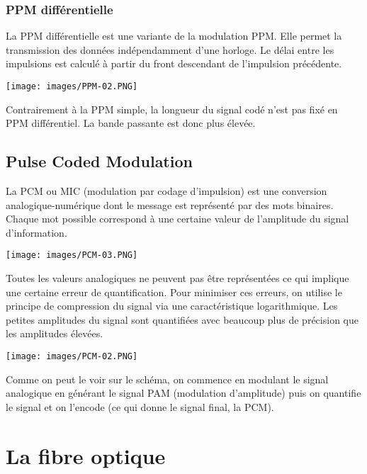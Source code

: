 \documentclass[a4paper]{article}
\begin{document}
\subsubsection{PPM différentielle}

La PPM différentielle est une variante de la modulation PPM. Elle permet la transmission des données indépendamment d'une horloge. Le délai entre les impulsions est calculé à partir du front descendant de l'impulsion précédente.
\begin{center}
    \texttt{[image: images/PPM-02.PNG]}
\end{center}
Contrairement à la PPM simple, la longueur du signal codé n'est pas fixé en PPM différentiel. La bande passante est donc plus élevée.





\subsection{Pulse Coded Modulation}



La PCM ou MIC (modulation par codage d'impulsion) est une conversion analogique-numérique dont le message est représenté par des mots binaires. Chaque mot possible correspond à une certaine valeur de l'amplitude du signal d'information.
\begin{center}
    \texttt{[image: images/PCM-03.PNG]}
\end{center}
Toutes les valeurs analogiques ne peuvent pas être représentées ce qui implique une certaine erreur de quantification. Pour minimiser ces erreurs, on utilise le principe de compression du signal via une caractéristique logarithmique. Les petites amplitudes du signal sont quantifiées avec beaucoup plus de précision que les amplitudes élevées.
\begin{center}
    \texttt{[image: images/PCM-02.PNG]}
\end{center}
Comme on peut le voir sur le schéma, on commence en modulant le signal analogique en générant le signal PAM (modulation d'amplitude) puis on quantifie le signal et on l'encode (ce qui donne le signal final, la PCM).










\section{La fibre optique} %
\end{document}
